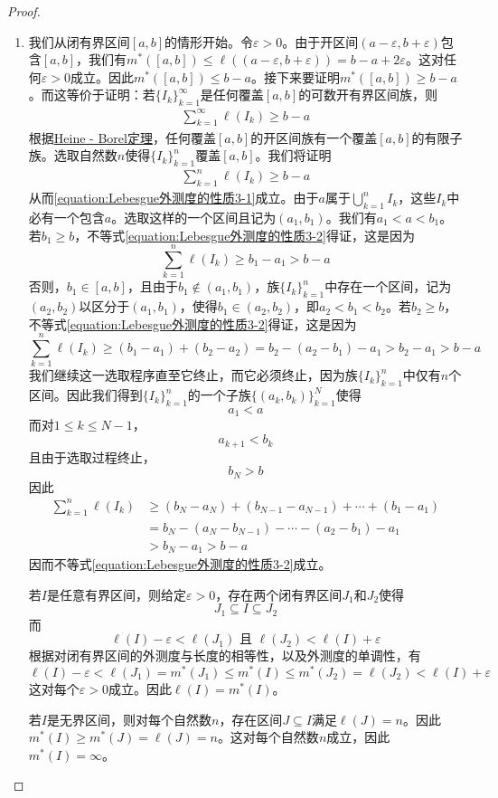 \documentclass[lang=cn,newtx,10pt,scheme=chinese]{../Template/elegantbook}
\begin{document}
\begin{proof}
\begin{enumerate}[(1)]
  \item 我们从闭有界区间\([a, b]\)的情形开始。令\(\varepsilon>0\)。由于开区间\((a - \varepsilon, b+\varepsilon)\)包含\([a, b]\)，我们有\(m^*([a, b])\leqslant\ell((a - \varepsilon, b+\varepsilon))=b - a + 2\varepsilon\)。这对任何\(\varepsilon>0\)成立。因此\(m^*([a, b])\leqslant b - a\)。接下来要证明\(m^*([a, b])\geqslant b - a\)。而这等价于证明：若\(\{I_k\}_{k = 1}^{\infty}\)是任何覆盖\([a, b]\)的可数开有界区间族，则
  \begin{align}
    \sum_{k = 1}^{\infty}\ell(I_k)\geqslant b - a \label{equation:Lebesgue外测度的性质3-1}
  \end{align}
  根据\hyperref[theorem:Heine - Borel定理]{Heine - Borel定理}，任何覆盖\([a, b]\)的开区间族有一个覆盖\([a, b]\)的有限子族。选取自然数\(n\)使得\(\{I_k\}_{k = 1}^{n}\)覆盖\([a, b]\)。我们将证明
  \begin{align}
    \sum_{k = 1}^{n}\ell(I_k)\geqslant b - a \label{equation:Lebesgue外测度的性质3-2}
  \end{align}
  从而\eqref{equation:Lebesgue外测度的性质3-1}成立。由于\(a\)属于\(\bigcup_{k = 1}^{n}I_k\)，这些\(I_k\)中必有一个包含\(a\)。选取这样的一个区间且记为\((a_1, b_1)\)。我们有\(a_1 < a < b_1\)。若\(b_1\geqslant b\)，不等式\eqref{equation:Lebesgue外测度的性质3-2}得证，这是因为
  \[
  \sum_{k = 1}^{n}\ell(I_k)\geqslant b_1 - a_1>b - a
  \]
  否则，\(b_1\in[a, b]\)，且由于\(b_1\notin(a_1, b_1)\)，族\(\{I_k\}_{k = 1}^{n}\)中存在一个区间，记为\((a_2, b_2)\)以区分于\((a_1, b_1)\)，使得\(b_1\in(a_2, b_2)\)，即\(a_2 < b_1 < b_2\)。若\(b_2\geqslant b\)，不等式\eqref{equation:Lebesgue外测度的性质3-2}得证，这是因为
  \[
  \sum_{k = 1}^{n}\ell(I_k)\geqslant(b_1 - a_1)+(b_2 - a_2)=b_2-(a_2 - b_1)-a_1>b_2 - a_1>b - a
  \]
  我们继续这一选取程序直至它终止，而它必须终止，因为族\(\{I_k\}_{k = 1}^{n}\)中仅有\(n\)个区间。因此我们得到\(\{I_k\}_{k = 1}^{n}\)的一个子族\(\{(a_k, b_k)\}_{k = 1}^{N}\)使得
  \[
  a_1 < a
  \]
  而对\(1\leqslant k\leqslant N - 1\)，
  \[
  a_{k + 1} < b_k
  \]
  且由于选取过程终止，
  \[
  b_N>b
  \]
  因此
  \begin{align*}
  \sum_{k = 1}^{n}\ell(I_k)&\geqslant(b_N - a_N)+(b_{N - 1} - a_{N - 1})+\cdots+(b_1 - a_1)\\
  &=b_N-(a_N - b_{N - 1})-\cdots-(a_2 - b_1)-a_1\\
  &>b_N - a_1>b - a
  \end{align*}
  因而不等式\eqref{equation:Lebesgue外测度的性质3-2}成立。
  
  若\(I\)是任意有界区间，则给定\(\varepsilon>0\)，存在两个闭有界区间\(J_1\)和\(J_2\)使得
  \[
  J_1\subseteq I\subseteq J_2
  \]
  而
  \[
  \ell(I)-\varepsilon<\ell(J_1)\text{ 且 }\ell(J_2)<\ell(I)+\varepsilon
  \]
  根据对闭有界区间的外测度与长度的相等性，以及外测度的单调性，有
  \[
  \ell(I)-\varepsilon<\ell(J_1)=m^*(J_1)\leqslant m^*(I)\leqslant m^*(J_2)=\ell(J_2)<\ell(I)+\varepsilon
  \]
  这对每个\(\varepsilon>0\)成立。因此\(\ell(I)=m^*(I)\)。
  
  若\(I\)是无界区间，则对每个自然数\(n\)，存在区间\(J\subseteq I\)满足\(\ell(J)=n\)。因此\(m^*(I)\geqslant m^*(J)=\ell(J)=n\)。这对每个自然数\(n\)成立，因此\(m^*(I)=\infty\)。
\end{enumerate}
\end{proof}
\end{document}
